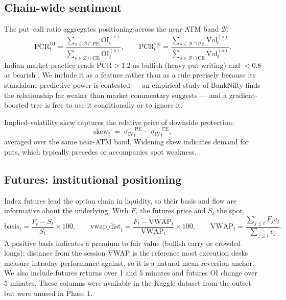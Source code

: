 \documentclass[11pt,a4paper]{article}
\begin{document}
\subsection{Chain-wide sentiment}

The put--call ratio aggregates positioning across the near-ATM band $\mathcal{B}$:
\begin{equation}
\text{PCR}^{\text{OI}}_t = \frac{\sum_{s\in\mathcal{B}\cap\text{PE}} \text{OI}^{(s)}_t}
{\sum_{s\in\mathcal{B}\cap\text{CE}} \text{OI}^{(s)}_t},
\qquad
\text{PCR}^{\text{vol}}_t = \frac{\sum_{s\in\mathcal{B}\cap\text{PE}} \text{Vol}^{(s)}_t}
{\sum_{s\in\mathcal{B}\cap\text{CE}} \text{Vol}^{(s)}_t}.
\end{equation}
Indian market practice reads $\text{PCR}>1.2$ as bullish (heavy put writing) and
$<0.8$ as bearish \cite{iifl,groww}. We include it as a feature rather than as a rule
precisely because its standalone predictive power is contested --- an empirical study of
BankNifty finds the relationship far weaker than market commentary suggests
\cite{pcrskeptic} --- and a gradient-boosted tree is free to use it conditionally or to
ignore it.

Implied-volatility skew captures the relative price of downside protection:
\begin{equation}
\text{skew}_t \;=\; \overline{\sigma_{\text{IV}}}^{\,\text{PE}}_t
- \overline{\sigma_{\text{IV}}}^{\,\text{CE}}_t ,
\end{equation}
averaged over the same near-ATM band. Widening skew indicates demand for puts, which
typically precedes or accompanies spot weakness.

\subsection{Futures: institutional positioning}

Index futures lead the option chain in liquidity, so their basis and flow are informative
about the underlying. With $F_t$ the futures price and $S_t$ the spot,
\begin{equation}
\text{basis}_t = \frac{F_t - S_t}{S_t}\times 100, \qquad
\text{vwap\_dist}_t = \frac{F_t - \text{VWAP}_t}{\text{VWAP}_t}\times 100,\qquad
\text{VWAP}_t = \frac{\sum_{j\le t} F_j v_j}{\sum_{j\le t} v_j}.
\end{equation}
A positive basis indicates a premium to fair value (bullish carry or crowded longs);
distance from the session VWAP is the reference most execution desks measure intraday
performance against, so it is a natural mean-reversion anchor. We also include futures
returns over 1 and 5 minutes and futures OI change over 5 minutes. These columns were
available in the Kaggle dataset from the outset but were unused in Phase 1.
\end{document}
